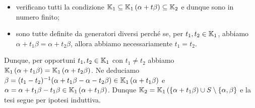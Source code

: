 \begin{itemize}
	\item verificano tutti la condizione $\mathbb{K}_1 \subseteq \mathbb{K}_1 \left ( \alpha + t \beta \right ) \subseteq \mathbb{K}_2$ e dunque sono in numero finito;
	\item sono tutte definite da generatori diversi perch\'e se, per $t_1, t_2 \in \mathbb{K}_1$, abbiamo $\alpha + t_1 \beta = \alpha + t_2 \beta$, allora abbiamo necessariamente $t_1 = t_2$.
\end{itemize}
\par Dunque, per opportuni $t_1, t_2 \in \mathbb{K}_1$ con $t_1 \neq t_2$ abbiamo $\mathbb{K}_1 \left ( \alpha + t_1 \beta \right ) = \mathbb{K}_1 \left ( \alpha + t_2 \beta \right )$. Ne deduciamo $\beta = (t_1 - t_2)^{-1} (\alpha + t_1 \beta - \alpha - t_2 \beta) \in \mathbb{K}_1 \left ( \alpha + t_1 \beta \right )$ e $\alpha = \alpha + t_1 \beta - t_1 \beta \in \mathbb{K}_1 \left ( \alpha + t_1 \beta \right )$. Dunque $\mathbb{K}_2 = \mathbb{K}_1 \left ( \lbrace \alpha + t_1 \beta \right ) \cup S \setminus \lbrace{\alpha, \beta \rbrace}$ e la tesi segue per ipotesi induttiva. \EndProof
